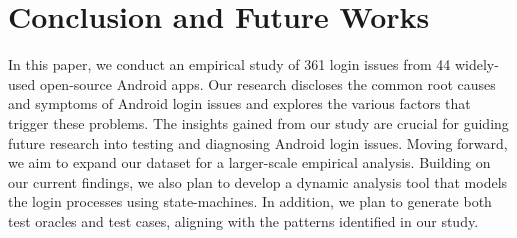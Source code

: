 \section{Conclusion and Future Works}
In this paper, we conduct an empirical study of 361 login issues from 44 widely-used open-source Android apps. Our research discloses the common root causes and symptoms of Android login issues and explores the various factors that trigger these problems. The insights gained from our study are crucial for guiding future research into testing and diagnosing Android login issues. Moving forward, we aim to expand our dataset for a larger-scale empirical analysis. Building on our current findings, we also plan to develop a dynamic analysis tool that models the login processes using state-machines. In addition, we plan to generate both test oracles and test cases, aligning with the patterns identified in our study.
